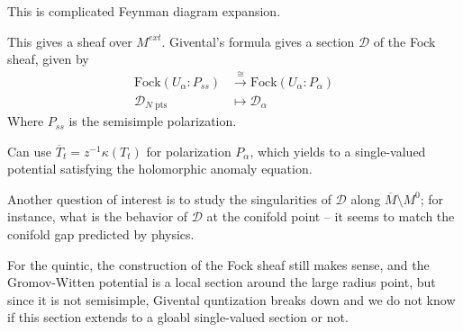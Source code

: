 \documentclass{amsart}
\theoremstyle{definition}
\begin{document}
This is complicated Feynman diagram expansion.

This gives a sheaf over $M^{ext}$.
Givental's formula gives a section $\mathcal{D}$ of the Fock sheaf, given by
\begin{align*}
\text{Fock}(U_\alpha:P_{ss})&\stackrel{\cong}\to \text{Fock}(U_\alpha:P_\alpha) \\
\mathcal{D}_{N\text{ pts}}&\mapsto \mathcal{D}_\alpha
\end{align*}
Where $P_{ss}$ is the semisimple polarization.

Can use $\overline{T}_t=z^{-1}\kappa(T_t)$ for polarization $P_\alpha$, which yields to a single-valued potential satisfying the holomorphic anomaly equation.

Another question of interest is to study the singularities of $\mathcal{D}$ along $\overline{M}\setminus M^0$; for instance, what is the behavior of $\mathcal{D}$ at the conifold point -- it seems to match the conifold gap predicted by physics.

For the quintic, the construction of the Fock sheaf still makes sense, and the Gromov-Witten potential is a local section around the large radius point, but since it is not semisimple, Givental quntization breaks down and we do not know if this section extends to a gloabl single-valued section or not.
\end{document}

